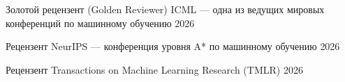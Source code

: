 
\begin{cvhonors}

  \cvhonor
    {Золотой рецензент (Golden Reviewer)} %
    {ICML — одна из ведущих мировых конференций по машинному обучению} %
    {} %
    {2026} %

  \cvhonor
    {Рецензент} %
    {NeurIPS — конференция уровня A* по машинному обучению} %
    {} %
    {2026} %

  \cvhonor
    {Рецензент} %
    {Transactions on Machine Learning Research (TMLR)} %
    {} %
    {2026} %

\end{cvhonors}
